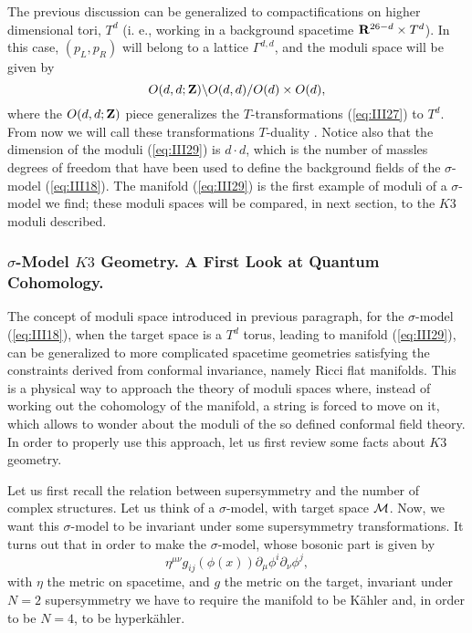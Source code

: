 The previous discussion can be generalized to compactifications on higher 
dimensional tori, $T^{d}$ (i. e., working in a background spacetime 
${\bf R}^{26-d} \times T^d$). In this case, $(p_L,p_R)$ will 
belong to a lattice $\Gamma^{d,d}$, and the moduli space will be
given by \cite{Narain}
\begin{equation}
O(d,d;{\bf Z}) \backslash O(d,d) / O(d) \times O(d),
\label{eq:III29}
\end{equation}
where the $O(d,d;{\bf Z})$ piece generalizes the $T$-transformations (\ref{eq:III27}) 
to $T^d$. From now we will call these transformations $T$-duality \cite{T}. Notice also 
that the dimension of the moduli (\ref{eq:III29}) is $d \cdot d$, which is 
the number of massles degrees of freedom that have been used to define the 
background fields of the $\sigma$-model (\ref{eq:III18}). The manifold 
(\ref{eq:III29}) is the first example of moduli of a $\sigma$-model we find; these 
moduli spaces will be compared, in next section, to the $K3$ moduli 
described. 

\subsubsection{$\sigma$-Model $K3$ Geometry. A First Look at Quantum Cohomology.}
\label{k3}

The concept of moduli space introduced in previous paragraph, for the $\sigma$-model 
(\ref{eq:III18}), when the target space is a $T^d$ torus, leading to 
manifold (\ref{eq:III29}), can be generalized to more complicated 
spacetime geometries satisfying the constraints derived from conformal invariance, 
namely Ricci flat manifolds. This is a physical way to approach the theory 
of moduli spaces where, instead of working out the cohomology of the manifold, 
a string is forced to move on it, which allows to wonder about the moduli 
of the so defined conformal field theory. In order to properly
use this approach, let us first review some facts about $K3$
geometry.

  
Let us first recall the relation between supersymmetry 
and the number of complex structures. Let us think of a $\sigma$-model,
with target space ${\cal M}$. Now, we want this $\sigma$-model to
be invariant under some supersymmetry transformations. It turns
out that in order to make the $\sigma$-model, whose bosonic part
is given by
\begin{equation}
\eta^{\mu \nu} g_{ij}(\phi(x))\partial_{\mu}\phi^{i}
\partial_{\nu}\phi^{j},
\label{eq:b1}
\end{equation}
with $\eta$ the metric on spacetime, and $g$ the metric on the
target, invariant under $N\!=\!2$ supersymmetry we have to
require the manifold to be K\"{a}hler and, in order to be
$N\!=\!4$, to be hyperk\"{a}hler.
  
